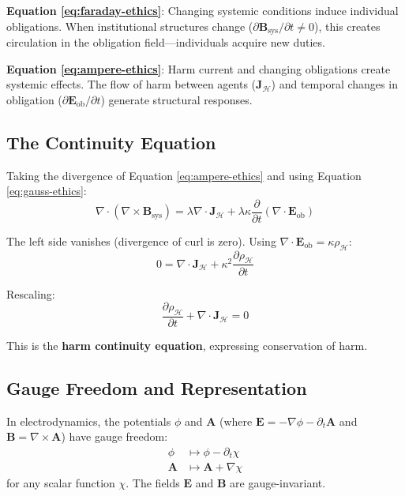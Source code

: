 \documentclass[12pt,letterpaper]{article}
\theoremstyle{definition}
\theoremstyle{remark}
\newcommand{\harm}{\mathcal{H}}
\begin{document}
\textbf{Equation \ref{eq:faraday-ethics}}: Changing systemic conditions induce individual obligations. When institutional structures change ($\partial \mathbf{B}_\text{sys}/\partial t \neq 0$), this creates circulation in the obligation field---individuals acquire new duties.

\textbf{Equation \ref{eq:ampere-ethics}}: Harm current and changing obligations create systemic effects. The flow of harm between agents ($\mathbf{J}_\harm$) and temporal changes in obligation ($\partial \mathbf{E}_\text{ob}/\partial t$) generate structural responses.

\subsection{The Continuity Equation}

Taking the divergence of Equation \ref{eq:ampere-ethics} and using Equation \ref{eq:gauss-ethics}:
\begin{equation}
\nabla \cdot (\nabla \times \mathbf{B}_\text{sys}) = \lambda \nabla \cdot \mathbf{J}_\harm + \lambda \kappa \frac{\partial}{\partial t}(\nabla \cdot \mathbf{E}_\text{ob})
\end{equation}

The left side vanishes (divergence of curl is zero). Using $\nabla \cdot \mathbf{E}_\text{ob} = \kappa \rho_\harm$:
\begin{equation}
0 = \nabla \cdot \mathbf{J}_\harm + \kappa^2 \frac{\partial \rho_\harm}{\partial t}
\end{equation}

Rescaling:
\begin{equation}
\boxed{\frac{\partial \rho_\harm}{\partial t} + \nabla \cdot \mathbf{J}_\harm = 0}
\end{equation}

This is the \textbf{harm continuity equation}, expressing conservation of harm.

\subsection{Gauge Freedom and Representation}

In electrodynamics, the potentials $\phi$ and $\mathbf{A}$ (where $\mathbf{E} = -\nabla \phi - \partial_t \mathbf{A}$ and $\mathbf{B} = \nabla \times \mathbf{A}$) have gauge freedom:
\begin{align}
\phi &\mapsto \phi - \partial_t \chi \\
\mathbf{A} &\mapsto \mathbf{A} + \nabla \chi
\end{align}
for any scalar function $\chi$. The fields $\mathbf{E}$ and $\mathbf{B}$ are gauge-invariant.
\end{document}
